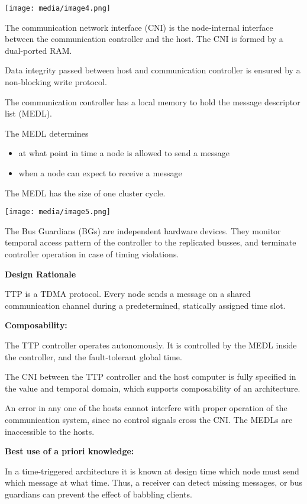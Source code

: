 \texttt{[image: media/image4.png]}

The communication network interface (CNI) is the node-internal interface
between the communication controller and the host. The CNI is formed by
a dual-ported RAM.

Data integrity passed between host and communication controller is
ensured by a non-blocking write protocol.

The communication controller has a local memory to hold the message
descriptor list (MEDL).

The MEDL determines

\begin{itemize}
\item
  at what point in time a node is allowed to send a message
\item
  when a node can expect to receive a message
\end{itemize}

The MEDL has the size of one cluster cycle.

\texttt{[image: media/image5.png]}

The Bus Guardians (BGs) are independent hardware devices. They monitor
temporal access pattern of the controller to the replicated busses, and
terminate controller operation in case of timing violations.

\textbf{Design Rationale}

TTP is a TDMA protocol. Every node sends a message on a shared
communication channel during a predetermined, statically assigned time
slot.

\textbf{Composability:}

The TTP controller operates autonomously. It is controlled by the MEDL
inside the controller, and the fault-tolerant global time.

The CNI between the TTP controller and the host computer is fully
specified in the value and temporal domain, which supports composability
of an architecture.

An error in any one of the hosts cannot interfere with proper operation
of the communication system, since no control signals cross the CNI. The
MEDLs are inaccessible to the hosts.

\textbf{Best use of a priori knowledge:}

In a time-triggered architecture it is known at design time which node
must send which message at what time. Thus, a receiver can detect
missing messages, or bus guardians can prevent the effect of babbling
clients.

